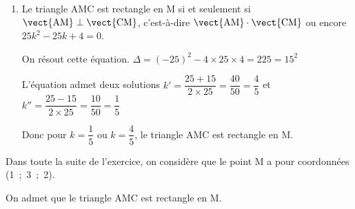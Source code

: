 \begin{enumerate}
\begin{enumerate}
		\item 
Le triangle AMC est rectangle en M si et seulement si $\vect{\text{AM}} \perp \vect{\text{CM}}$, c'est-à-dire $\vect{\text{AM}} \cdot \vect{\text{CM}}$ ou encore $25k^2-25k+4=0$.		
		
On résout cette équation.
$\Delta = (-25)^2-4\times 25\times 4 = 225 = 15^{2}$

L'équation admet deux solutions 
$k'=\dfrac{25+15}{2\times 25} = \dfrac{40}{50}=\dfrac{4}{5}$
et
$k''=\dfrac{25-15}{2\times 25} = \dfrac{10}{50}=\dfrac{1}{5}$

Donc pour $k=\dfrac{1}{5}$ ou $k=\dfrac{4}{5}$, le triangle AMC est rectangle en M.
		
	\end{enumerate}
\end{enumerate}	

Dans toute la suite de l'exercice, on considère que le point M a pour coordonnées (1~;~3~;~2).

On admet que le triangle AMC est rectangle en M.



